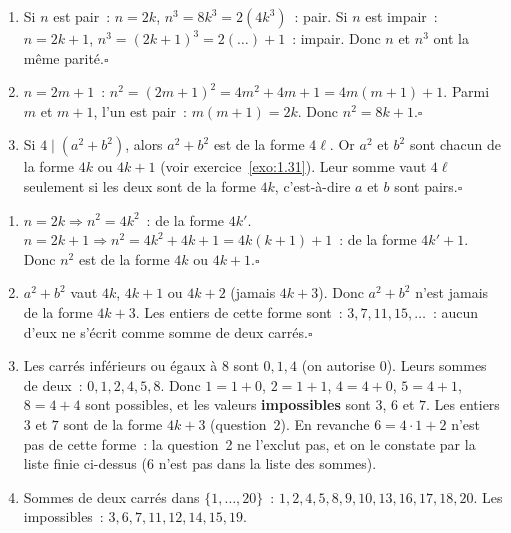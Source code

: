 
\begin{enumerate}
  \item Si $n$ est pair~: $n=2k$, $n^3=8k^3=2(4k^3)$~: pair.
        Si $n$ est impair~: $n=2k+1$, $n^3=(2k+1)^3=2(\ldots)+1$~: impair.
        Donc $n$ et $n^3$ ont la m\^eme parit\'e.\hfill$\square$
  \item $n=2m+1$~: $n^2=(2m+1)^2=4m^2+4m+1=4m(m+1)+1$.
        Parmi $m$ et $m+1$, l'un est pair~: $m(m+1)=2k$.
        Donc $n^2=8k+1$.\hfill$\square$
  \item Si $4\mid(a^2+b^2)$, alors $a^2+b^2$ est de la forme $4\ell$.
        Or $a^2$ et $b^2$ sont chacun de la forme $4k$ ou $4k+1$
        (voir exercice~\ref{exo:1.31}). Leur somme vaut $4\ell$ seulement si
        les deux sont de la forme $4k$, c'est-\`a-dire $a$ et $b$ sont pairs.\hfill$\square$
\end{enumerate}


\begin{enumerate}
  \item $n=2k\Rightarrow n^2=4k^2$~: de la forme $4k'$.
        $n=2k+1\Rightarrow n^2=4k^2+4k+1=4k(k+1)+1$~: de la forme $4k'+1$.
        Donc $n^2$ est de la forme $4k$ ou $4k+1$.\hfill$\square$
  \item $a^2+b^2$ vaut $4k$, $4k+1$ ou $4k+2$ (jamais $4k+3$).
        Donc $a^2+b^2$ n'est jamais de la forme $4k+3$.
        Les entiers de cette forme sont~: $3,7,11,15,\ldots$~:
        aucun d'eux ne s'\'ecrit comme somme de deux carr\'es.\hfill$\square$
  \item Les carr\'es inf\'erieurs ou \'egaux \`a $8$ sont $0,1,4$ (on autorise $0$).
        Leurs sommes de deux~: $0,1,2,4,5,8$. Donc
        $1=1+0$, $2=1+1$, $4=4+0$, $5=4+1$, $8=4+4$ sont possibles,
        et les valeurs \textbf{impossibles} sont $3$, $6$ et $7$.
        Les entiers $3$ et $7$ sont de la forme $4k+3$ (question~2).
        En revanche $6=4\cdot1+2$ n'est pas de cette forme~: la question~2 ne l'exclut pas,
        et on le constate par la liste finie ci-dessus ($6$ n'est pas dans la liste des sommes).
  \item Sommes de deux carr\'es dans $\{1,\ldots,20\}$~:
        $1,2,4,5,8,9,10,13,16,17,18,20$. Les impossibles~: $3,6,7,11,12,14,15,19$.
\end{enumerate}



